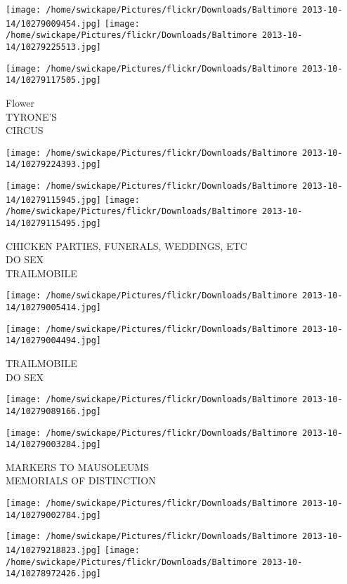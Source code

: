 \documentclass[10pt,letterpaper]{article}
\begin{document}
\texttt{[image: /home/swickape/Pictures/flickr/Downloads/Baltimore 2013-10-14/10279009454.jpg]}
\texttt{[image: /home/swickape/Pictures/flickr/Downloads/Baltimore 2013-10-14/10279225513.jpg]}

\texttt{[image: /home/swickape/Pictures/flickr/Downloads/Baltimore 2013-10-14/10279117505.jpg]}

Flower\\
TYRONE'S\\
CIRCUS\\
\pagebreak

\texttt{[image: /home/swickape/Pictures/flickr/Downloads/Baltimore 2013-10-14/10279224393.jpg]}

\vspace{0.25in}
\texttt{[image: /home/swickape/Pictures/flickr/Downloads/Baltimore 2013-10-14/10279115945.jpg]}
\texttt{[image: /home/swickape/Pictures/flickr/Downloads/Baltimore 2013-10-14/10279115495.jpg]}

CHICKEN PARTIES, FUNERALS, WEDDINGS, ETC\\
DO SEX\\
TRAILMOBILE\\
\pagebreak

\texttt{[image: /home/swickape/Pictures/flickr/Downloads/Baltimore 2013-10-14/10279005414.jpg]}

\vspace{0.25in}
\texttt{[image: /home/swickape/Pictures/flickr/Downloads/Baltimore 2013-10-14/10279004494.jpg]}

TRAILMOBILE\\
DO SEX\\
\pagebreak

\texttt{[image: /home/swickape/Pictures/flickr/Downloads/Baltimore 2013-10-14/10279089166.jpg]}

\vspace{0.25in}
\texttt{[image: /home/swickape/Pictures/flickr/Downloads/Baltimore 2013-10-14/10279003284.jpg]}

MARKERS TO MAUSOLEUMS\\
MEMORIALS OF DISTINCTION\\
\pagebreak

\texttt{[image: /home/swickape/Pictures/flickr/Downloads/Baltimore 2013-10-14/10279002784.jpg]}

\vspace{0.25in}
\texttt{[image: /home/swickape/Pictures/flickr/Downloads/Baltimore 2013-10-14/10279218823.jpg]}
\texttt{[image: /home/swickape/Pictures/flickr/Downloads/Baltimore 2013-10-14/10278972426.jpg]}
\end{document}
